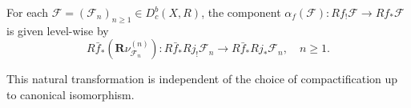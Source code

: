 \begin{definition}
For each $\mathcal{F} = (\mathcal{F}_n)_{n \geq 1} \in D_c^b(X, R)$, the component $\alpha_f(\mathcal{F}): Rf_! \mathcal{F} \to Rf_* \mathcal{F}$ is given level-wise by
$$R\bar{f}_*(\mathbf{R}\nu^{(n)}_{\mathcal{F}_n}): R\bar{f}_* Rj_! \mathcal{F}_n \longrightarrow R\bar{f}_* Rj_* \mathcal{F}_n, \quad n \geq 1.$$

This natural transformation is independent of the choice of compactification up to canonical isomorphism.
\end{definition}
